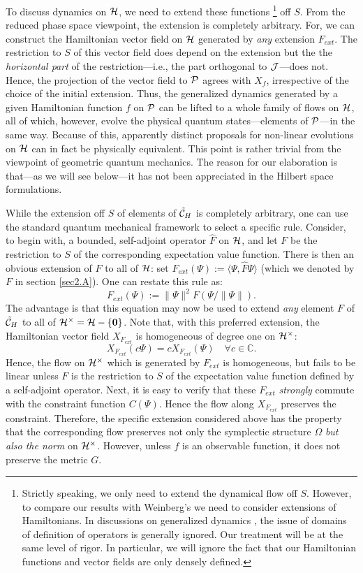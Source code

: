 \documentclass[12pt,aps,eqsecnum,tighten,nofootinbib]{revtex4-2}
\def\be{\begin{equation}}
\def\ee{\end{equation}}
\def\<{\langle}
\def\>{\rangle}
\def\C{{\mathbb C}}
\def\H{{\cal H}}
\def\punctH{{\cal H}^{\times}}
\def\P{{\cal P}}
\def\J{{\cal J}}
\newcommand{\hvf}[1]{{X_{#1}}}
\def\C{\mathbb C}
\def\ch{{\cal C}_H}
\begin{document}
To discuss dynamics on $\H$, we need to extend these functions%
%
\footnote{Strictly speaking, we only need to extend the dynamical flow
off $S$. However, to compare our results with Weinberg's \cite{weinberg}
we need to consider extensions of Hamiltonians. In discussions on
generalized dynamics \cite{weinberg,birula}, the issue of domains of
definition of operators is generally ignored. Our treatment will be at
the same level of rigor. In particular, we will ignore the fact that
our Hamiltonian functions and vector fields are only densely
defined.}
%
off $S$. {}From the reduced phase space viewpoint, the extension is
completely arbitrary. For, we can construct the Hamiltonian vector
field on $\H$ generated by {\it any} extension $F_{ext}$.  The
restriction to $S$ of this vector field does depend on the extension
but the the {\it horizontal part} of the restriction---i.e., the part
orthogonal to $\J$---does not. Hence, the projection of the vector
field to $\P$ agrees with $X_f$, irrespective of the choice of the
initial extension. Thus, the generalized dynamics generated by a given
Hamiltonian function $f$ on $\P$ can be lifted to a whole family of
flows on $\H$, all of which, however, evolve the physical quantum
states---elements of $\P$---in the same way. Because of this,
apparently distinct proposals for non-linear evolutions on $\H$ can in
fact be physically equivalent. This point is rather trivial from the
viewpoint of geometric quantum mechanics. The reason for our
elaboration is that---as we will see below---it has not been
appreciated in the Hilbert space formulations.

While the extension off $S$ of elements of $\tilde\ch$ is completely
arbitrary, one can use the standard quantum mechanical framework to
select a specific rule. Consider, to begin with, a bounded,
self-adjoint operator $\hat{F}$ on $\H$, and let $F$ be the
restriction to $S$ of the corresponding expectation value function.
There is then an obvious extension of $F$ to all of $\H$: set
$F_{ext}(\Psi) := \<\Psi, \hat{F}\Psi\>$ (which we denoted by $F$ in
section \ref{sec2.A}). One can restate this rule as:
%
\be\label{f_ext} 
F_{ext}(\Psi) := \|\Psi\|^2 F( \Psi / \|\Psi\| ).  
\ee
%
The advantage is that this equation may now be used to extend {\em
any} element $F$ of $\tilde\ch$ to all of $\punctH = \H-\{{\mathbf
0}\}$. Note that, with this preferred extension, the Hamiltonian
vector field $\hvf{F_{ext}}$ is homogeneous of degree one on
$\punctH$:
%
\be \label{hom}
\hvf{F_{ext}}(c\Psi) = c \hvf{F_{ext}}(\Psi) \quad \forall c\in \C.  
\ee 
%
Hence, the flow on $\punctH$ which is generated by $F_{ext}$ is
homogeneous, but fails to be linear unless $F$ is the restriction to
$S$ of the expectation value function defined by a self-adjoint
operator.  Next, it is easy to verify that these $F_{ext}$ {\em
strongly} commute with the constraint function $C(\Psi)$.  Hence the
flow along $\hvf{F_{ext}}$ preserves the constraint.  Therefore, the
specific extension considered above has the property that the
corresponding flow preserves not only the symplectic structure
$\Omega$ {\it but also the norm} on $\punctH$. However, unless $f$ is
an observable function, it does not preserve the metric $G$.
\end{document}
